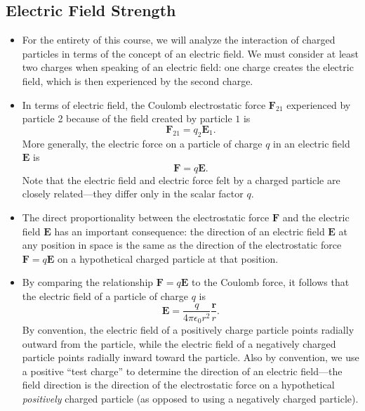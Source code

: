 \documentclass[11pt, a4paper]{article}
\renewcommand{\vec}[1]{\bm{#1}} %
\renewcommand{\r}{\vec{r}}
\newcommand{\E}{\vec{E}} %
\newcommand{\ee}{\epsilon_{0}}  %
\begin{document}
\subsection{Electric Field Strength}
\begin{itemize}

    \item For the entirety of this course, we will analyze the interaction of charged particles in terms of the concept of an electric field. We must consider at least two charges when speaking of an electric field: one charge creates the electric field, which is then experienced by the second charge.

    \item In terms of electric field, the Coulomb electrostatic force $ \vec{F}_{21} $ experienced by particle 2 because of the field created by particle $ 1 $ is
    \begin{equation*}
        \vec{F}_{21} = q_{2} \E_{1}.
    \end{equation*}
    More generally, the electric force on a particle of charge $ q $ in an electric field $ \E $ is
    \begin{equation*}
        \vec{F} = q \E.
    \end{equation*}
    Note that the electric field and electric force felt by a charged particle are closely related---they differ only in the scalar factor $ q $. 

    \item The direct proportionality between the electrostatic force $ \vec{F} $ and the electric field $ \E $ has an important consequence: the direction of an electric field $ \E $ at any position in space is the same as the direction of the electrostatic force $ \vec{F} = q \E $ on a hypothetical charged particle at that position. 

    \item By comparing the relationship $ \vec{F} = q \E $ to the Coulomb force, it follows that the electric field of a particle of charge $ q $ is
    \begin{equation*}
        \E = \frac{q}{4\pi \ee r^{2}}\frac{\r}{r}.
    \end{equation*}
    By convention, the electric field of a positively charge particle points radially outward from the particle, while the electric field of a negatively charged particle points radially inward toward the particle. Also by convention, we use a positive ``test charge'' to determine the direction of an electric field---the field direction is the direction of the electrostatic force on a hypothetical \textit{positively} charged particle (as opposed to using a negatively charged particle).

\end{itemize}
\end{document}
